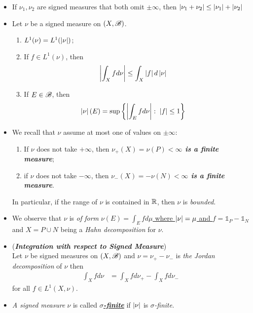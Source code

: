 \documentclass[11pt]{article}
\begin{document}
\begin{itemize}
\item \begin{proposition}
If $\nu_1, \nu_2$ are signed measures that both omit $\pm \infty$, then $\left\lvert \nu_1 + \nu_2 \right\rvert \le \left\lvert \nu_1 \right\rvert + \left\lvert \nu_2 \right\rvert$
\end{proposition}

\item \begin{exercise}
Let $\nu$ be a signed measure on $(X, {\mathscr B})$. 
\begin{enumerate}
\item $L^1(\nu) = L^{1}(\left\lvert \nu \right\rvert)$;
\item If $f \in L^1(\nu)$,  then
\begin{align*}
\left\lvert \int_X f d\nu \right\rvert &\le \int_X \left\lvert f \right\rvert d\left\lvert \nu \right\rvert
\end{align*}
\item If $E \in {\mathscr B}$, then 
\begin{align*}
\left\lvert \nu \right\rvert(E) &= \sup\left\{\left\lvert \int_E f d\nu \right\rvert: \; \left\lvert f \right\rvert \le 1\right\}
\end{align*}
\end{enumerate}
\end{exercise}


\item \begin{remark} 
We recall that $\nu$ assume at most one of values on $\pm \infty$:
\begin{enumerate}
\item If $\nu$ does not take $+\infty$, then \emph{\textbf{$\nu_{+}(X)  = \nu(P)<\infty$ is a finite measure}};
\item if $\nu$ does not take $-\infty$, then \emph{\textbf{$\nu_{-}(X)  = -\nu(N)<\infty$ is a finite measure}}.
\end{enumerate}
In particular, if the range of $\nu$ is contained in ${\mathbb R}$, then $\nu$ is \emph{bounded}.
\end{remark}

\item \begin{remark} 
We observe that $\nu$ is \emph{of form} \underline{$\nu(E) = \int_{E} f d\mu$ where $\left\lvert \nu \right\rvert= \mu$ and $f= \mathds{1}_{P} -\mathds{1}_{N}$} and $X = P\cup N$ being a \emph{Hahn decomposition} for $\nu$.
\end{remark}


\item \begin{remark} (\emph{\textbf{Integration with respect to Signed Measure}})\\
Let $\nu$ be  signed measures on $(X, {\mathscr B})$ and $\nu = \nu_{+} - \nu_{-}$ is \emph{the Jordan decomposition} of $\nu$ then 
\begin{align*}
\int_{X} f d\nu &= \int_{X} f d\nu_{+} - \int_{X} f d\nu_{-}
\end{align*} for all $f\in L^{1}(X,\nu)$.
\end{remark}

\item \begin{definition} 
\emph{A signed measure} $\nu$ is called \underline{\emph{\textbf{$\sigma$-finite}}} if $\left\lvert \nu \right\rvert$ is \emph{$\sigma$-finite}.
\end{definition}
\end{itemize}
\end{document}
